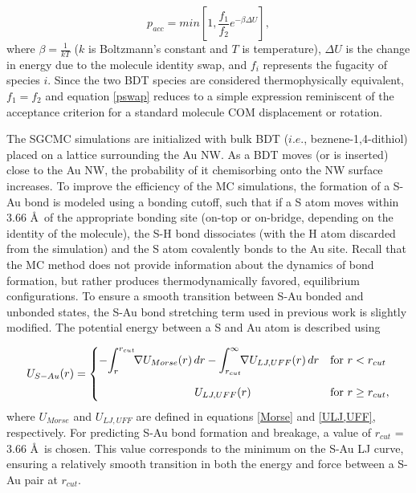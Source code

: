 \documentclass[10pt]{report}  %
\begin{document}
\begin{equation}p_{acc} = min[1,\frac{f_{1}}{f_{2}}e^{-\beta\Delta U}],\label{pswap}\end{equation} where $\beta = \frac{1}{kT}$ ($k$ is Boltzmann's constant and $T$ is temperature), $\Delta U$ is the change in energy due to the molecule identity swap, and $f_{i}$ represents the fugacity of species $i$.  Since the two BDT species are considered thermophysically equivalent, $f_{1} = f_{2}$ and equation \ref{pswap} reduces to a simple expression reminiscent of the acceptance criterion for a standard molecule COM displacement or rotation.

The SGCMC simulations are initialized with bulk BDT ($i.e.$, beznene-1,4-dithiol) placed on a lattice surrounding the Au NW. As a BDT moves (or is inserted) close to the Au NW, the probability of it chemisorbing onto the NW surface increases. To improve the efficiency of the MC simulations, the formation of a S-Au bond is modeled using a bonding cutoff, such that if a S atom moves within 3.66 \AA\ of the appropriate bonding site (on-top or on-bridge, depending on the identity of the molecule), the S-H bond dissociates (with the H atom discarded from the simulation) and the S atom covalently bonds to the Au site.  Recall that the MC method does not provide information about the dynamics of bond formation, but rather produces thermodynamically favored, equilibrium configurations. To ensure a smooth transition between S-Au bonded and unbonded states, the S-Au bond stretching term used in previous work \cite{Pu:2010} is slightly modified. The potential energy between a S and Au atom is described using

\begin{equation}
U_{S-Au}(r) =
\begin{cases} -\mathlarger{\int}_r^{r_{cut}} \! \nabla U_{Morse}(r) \, dr - \mathlarger{\int}_{r_{cut}}^\infty \! \nabla U_{LJ,UFF}(r) \, dr & \text{for $r<r_{cut}$} \\[5mm] 
\hspace{3cm}U_{LJ,UFF}(r) & \text{for $r\ge r_{cut} ,$}
\end{cases}
\label{Utot}
\end{equation} where $U_{Morse}$ and $U_{LJ,UFF}$ are defined in equations \ref{Morse} and \ref{ULJ,UFF}, respectively. For predicting S-Au bond formation and breakage, a value of $r_{cut}$ = 3.66 \AA\ is chosen.  This value corresponds to the minimum on the S-Au LJ curve, ensuring a relatively smooth transition in both the energy and force between a S-Au pair at $r_{cut}$.
\end{document}
